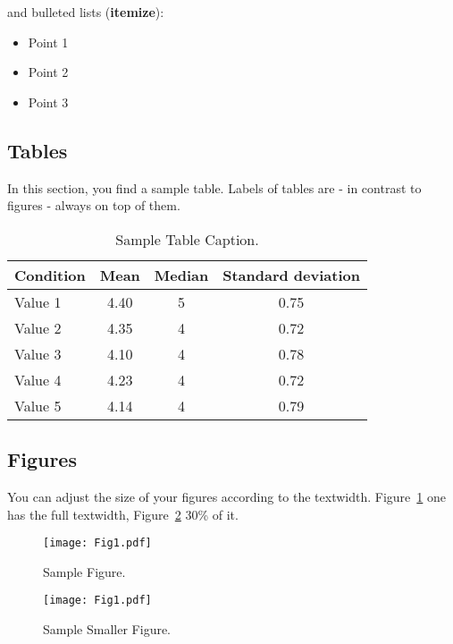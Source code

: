 and bulleted lists (\textbf{itemize}):

\begin{itemize}
    \item Point 1
    \item Point 2
    \item Point 3
\end{itemize}


\subsection{Tables}
\label{sec:tables}

In this section, you find a sample table. Labels of tables are - in contrast to figures - always on top of them.

\begin{table} [h]
\centering
\caption{Sample Table Caption.}
\label{tab:feedback}
\begin{tabular}{lccc}
\toprule
\textbf{Condition} & \textbf{Mean} & \textbf{Median} & \textbf{Standard deviation} \\
\midrule
Value 1 & 4.40 & 5 & 0.75 \\
Value 2 & 4.35 & 4 & 0.72 \\
Value 3 & 4.10 & 4 & 0.78 \\
Value 4 & 4.23 & 4 & 0.72 \\
Value 5 & 4.14 & 4 & 0.79 \\
\bottomrule
\end{tabular}
\end{table}

\subsection{Figures}
\label{sec:figures}

You can adjust the size of your figures according to the textwidth. Figure~\ref{fig:Fig1} one has the full textwidth, Figure~\ref{fig:Fig2} 30\% of it.

\begin{figure} [!htb]
  \centering
  \texttt{[image: Fig1.pdf]}
  \caption{Sample Figure.}
  \label{fig:Fig1}
\end{figure}


\begin{figure} [!htb]
  \centering
  \texttt{[image: Fig1.pdf]}
 \caption{Sample Smaller Figure.}
  \label{fig:Fig2}
\end{figure}


